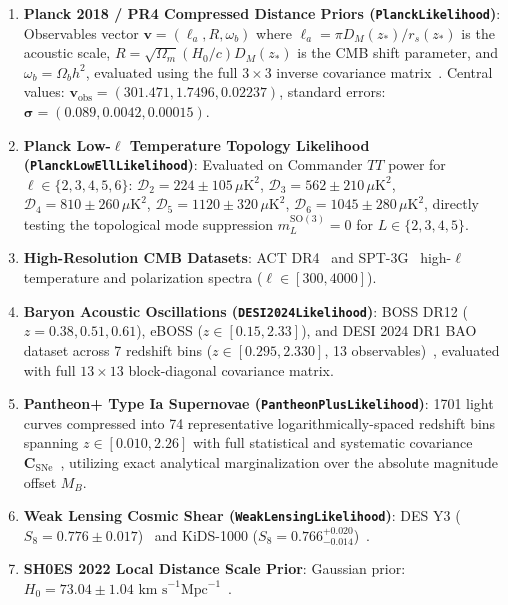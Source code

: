 \documentclass[11pt,a4paper]{article}
\theoremstyle{definition}
\newcommand{\SO}{\mathrm{SO}}
\begin{document}
\begin{enumerate}
    \item \textbf{Planck 2018 / PR4 Compressed Distance Priors (\texttt{PlanckLikelihood})}:
    Observables vector $\mathbf{v} = (\ell_a, R, \omega_b)$ where $\ell_a = \pi D_M(z_*)/r_s(z_*)$ is the acoustic scale, $R = \sqrt{\Omega_m}(H_0/c)D_M(z_*)$ is the CMB shift parameter, and $\omega_b = \Omega_b h^2$, evaluated using the full $3 \times 3$ inverse covariance matrix~\cite{Planck2018Params,Tristram2024}. Central values: $\mathbf{v}_{\mathrm{obs}} = (301.471, 1.7496, 0.02237)$, standard errors: $\boldsymbol{\sigma} = (0.089, 0.0042, 0.00015)$.
    
    \item \textbf{Planck Low-$\ell$ Temperature Topology Likelihood (\texttt{PlanckLowEllLikelihood})}:
    Evaluated on Commander $TT$ power for $\ell \in \{2, 3, 4, 5, 6\}$: $\mathcal{D}_2 = 224 \pm 105\,\mu\text{K}^2$, $\mathcal{D}_3 = 562 \pm 210\,\mu\text{K}^2$, $\mathcal{D}_4 = 810 \pm 260\,\mu\text{K}^2$, $\mathcal{D}_5 = 1120 \pm 320\,\mu\text{K}^2$, $\mathcal{D}_6 = 1045 \pm 280\,\mu\text{K}^2$, directly testing the topological mode suppression $m_L^{\SO(3)} = 0$ for $L \in \{2, 3, 4, 5\}$.
    
    \item \textbf{High-Resolution CMB Datasets}:
    ACT DR4~\cite{Aiola2020} and SPT-3G~\cite{Dutcher2021,Balkenhol2023} high-$\ell$ temperature and polarization spectra ($\ell \in [300, 4000]$).
    
    \item \textbf{Baryon Acoustic Oscillations (\texttt{DESI2024Likelihood})}:
    BOSS DR12 ($z = 0.38, 0.51, 0.61$), eBOSS ($z \in [0.15, 2.33]$), and DESI 2024 DR1 BAO dataset across 7 redshift bins ($z \in [0.295, 2.330]$, 13 observables)~\cite{DESI2024BAO}, evaluated with full $13 \times 13$ block-diagonal covariance matrix.
    
    \item \textbf{Pantheon+ Type Ia Supernovae (\texttt{PantheonPlusLikelihood})}:
    1701 light curves compressed into 74 representative logarithmically-spaced redshift bins spanning $z \in [0.010, 2.26]$ with full statistical and systematic covariance $\mathbf{C}_{\mathrm{SNe}}$~\cite{PantheonPlus2022}, utilizing exact analytical marginalization over the absolute magnitude offset $M_B$.
    
    \item \textbf{Weak Lensing Cosmic Shear (\texttt{WeakLensingLikelihood})}:
    DES Y3 ($S_8 = 0.776 \pm 0.017$)~\cite{DES2022} and KiDS-1000 ($S_8 = 0.766^{+0.020}_{-0.014}$)~\cite{KiDS2021}.
    
    \item \textbf{SH0ES 2022 Local Distance Scale Prior}:
    Gaussian prior: $H_0 = 73.04 \pm 1.04\text{ km s}^{-1}\text{Mpc}^{-1}$~\cite{Riess2022}.
\end{enumerate}
\end{document}
